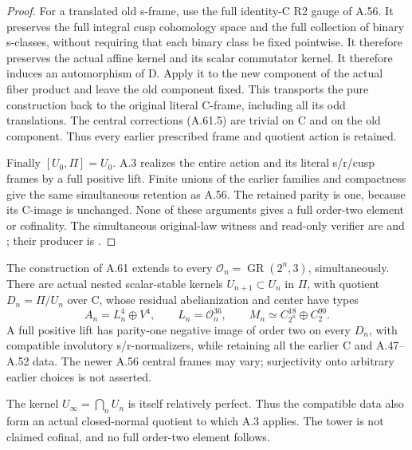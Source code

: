 \begin{proof}
For a translated old s-frame, use the full identity-C R2
gauge of A.56. It preserves the full integral cusp
cohomology space and the full collection of binary s-classes,
without requiring that each binary class be fixed pointwise.
It therefore preserves the
actual affine kernel and its scalar commutator kernel.
It therefore induces an automorphism of D. Apply it to
the new component of the actual fiber product and leave
the old component fixed. This transports the pure construction
back to the original literal C-frame, including all its odd
translations. The central corrections (A.61.5) are trivial
on C and on the old component. Thus every earlier prescribed
frame and quotient action is retained.

Finally \([U_0,\Pi]=U_0\). A.3 realizes the entire action
and its literal s/r/cusp frames by a full positive lift.
Finite unions of the earlier families and compactness give
the same simultaneous retention as A.56. The retained
parity is one, because its C-image is unchanged. None of
these arguments gives a full order-two element or cofinality.
The simultaneous original-law witness and read-only verifier
are  and
; their producer is
.
\end{proof}


The construction of A.61 extends to every
\(\mathcal O_n=\operatorname{GR}(2^n,3)\), simultaneously.
There are actual nested scalar-stable kernels
\(U_{n+1}\subset U_n\) in \(\Pi\), with quotient
\(D_n=\Pi/U_n\) over C, whose residual abelianization and
center have types
\[
 A_n=L_n^4\oplus V^4,\qquad L_n=\mathcal O_n^{36},
 \qquad
 M_n\simeq C_{2^n}^{18}\oplus C_2^{90}.
 \tag{A.62.1}
\]
A full positive lift has parity-one negative image of order
two on every \(D_n\), with compatible involutory s/r-normalizers,
while retaining all the earlier C and A.47--A.52 data.
The newer A.56 central frames may vary; surjectivity onto
arbitrary earlier choices is not asserted.

The kernel \(U_\infty=\bigcap_nU_n\) is itself relatively
perfect. Thus the compatible data also form an actual
closed-normal quotient to which A.3 applies. The tower is
not claimed cofinal, and no full order-two element follows.

